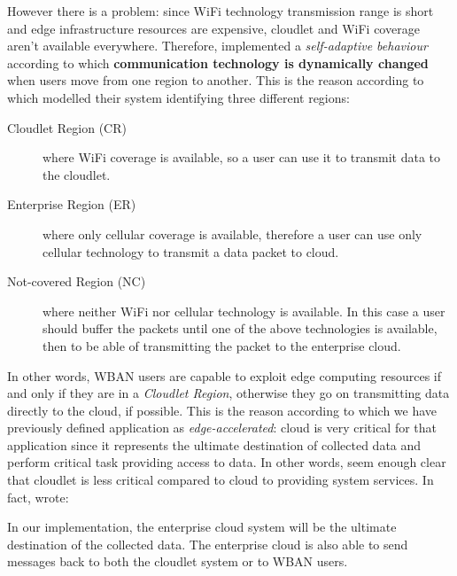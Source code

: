 \documentclass[sigchi]{acmart}
\begin{document}
However there is a problem: since WiFi technology transmission range is short and edge infrastructure resources are expensive,  cloudlet and WiFi coverage aren't available everywhere. Therefore, \citet{MSAReport} implemented a \textit{self-adaptive behaviour} according to which \textbf{communication technology is dynamically changed} when users move from one region to another. This is the reason according to which \citet{MSAReport} modelled their system identifying three different regions:\cite[par.~3.1]{MSAReport} 

\begin{description}

\item[Cloudlet Region (CR)] where WiFi coverage is available, so a user can use it to transmit data to the cloudlet.

\item[Enterprise Region (ER)] where only cellular coverage is available, therefore  a user can use only cellular technology to transmit a data packet to cloud. 

\item[Not-covered Region (NC)] where neither WiFi nor cellular technology is available. In this case a user should buffer the packets until one of the above technologies is available, then to be able of transmitting the packet to the enterprise cloud. 

\end{description}

In other words, WBAN users are capable to exploit edge computing resources if and only if they are in a \textit{Cloudlet Region}, otherwise they go on transmitting data directly to the cloud, if possible. This is the reason according to which we have previously defined \citet{MSAReport} application as \textit{edge-accelerated}: cloud is very critical for that application since it represents the ultimate destination of collected data and perform critical task providing access to data. In other words, seem enough clear that cloudlet is less critical compared to cloud to providing system services. In fact, \citet{MSAReport} wrote:

\vspace{0.3cm}

\begin{quoting}[font=itshape, begintext={``}, endtext={''\cite[par.~3.2]{MSAReport}}]
In our implementation, the enterprise cloud system will be the ultimate destination of the collected data. The enterprise cloud is also able to send messages back to both the cloudlet system or to WBAN users.
\end{quoting}
\end{document}
